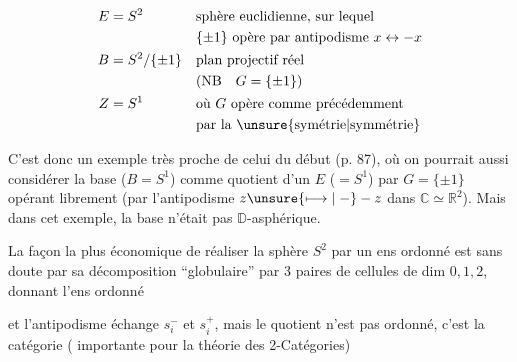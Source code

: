 \[
\begin{aligned}
E&=S^2&&\text{sphère euclidienne, sur lequel}\\
&&&\{\pm1\}\text{ opère par antipodisme }x\leftrightarrow-x\\
B&=S^2/\{\pm1\}&&\text{plan projectif réel}\\
&&&(\mathrm{NB}\quad G=\{\pm1\})\\
Z&=S^1&&\text{où $G$ opère comme précédemment}\\
&&&\text{par la \unsure{symétrie|symmétrie}}
\end{aligned}
\]

C'est donc un exemple très proche de celui du début (p. 87),  où on pourrait aussi considérer la base ($B=S^1$) comme quotient d'un $E$ ($=S^1$) par $G=\{\pm1\}$ opérant librement (par l'antipodisme $z\unsure{\longmapsto|\relbar}-z$ dans $\mathbb C\simeq\mathbb R^2$). Mais dans cet exemple, la base n'était pas $\mathbb D$-asphérique.

La façon la plus économique de réaliser la sphère $S^2$ par un ens ordonné est sans doute par sa décomposition ``globulaire'' par 3 paires de cellules de dim $0,1,2$, donnant l'ens ordonné




et l'antipodisme échange $s_i^-$ et $s_i^+$, mais le  quotient n'est pas ordonné, c'est la catégorie ( importante pour la théorie des 2-Catégories)

